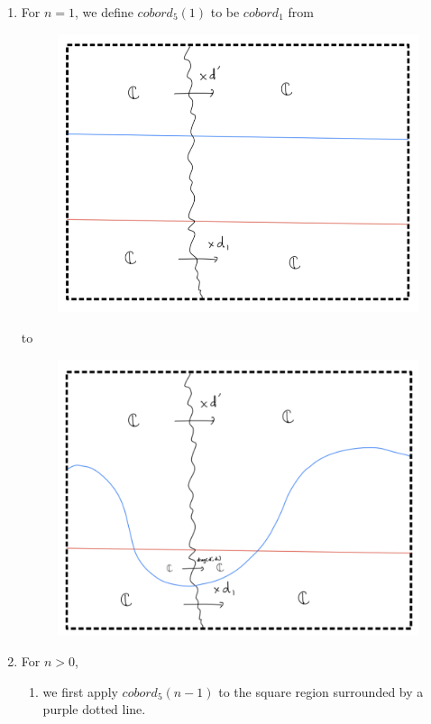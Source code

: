 \begin{enumerate}[label = (\roman*)]
\item For $n=1$, we define $cobord_5(1)$ to be $cobord_1$ from
\begin{figure}[H]
    \centering
    \includegraphics[scale = 0.8]{diagrams/cobord5/2.png} 
    \caption{}
    \label{fig:your-label}
\end{figure}
to
\begin{figure}[H]
    \centering
    \includegraphics[scale = 0.6]{diagrams/cobord5/3.png} 
    \caption{}
    \label{fig:your-label}
\end{figure}
\pagebreak 
\item For $n>0$,
\begin{enumerate}[label = (Step \arabic*)]
\item we first apply $cobord_5(n-1)$ to the square region surrounded by a purple dotted line.


\end{enumerate}
\end{enumerate}
